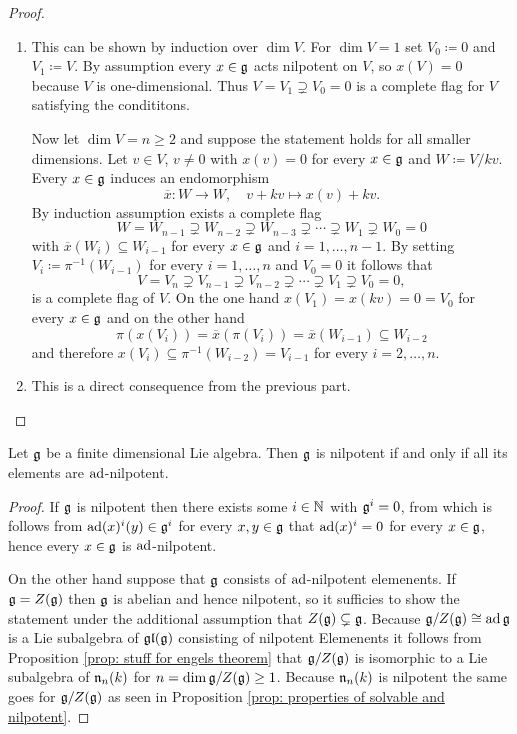 \begin{proof}
\begin{enumerate}[leftmargin=*]
  \item
   This can be shown by induction over $\dim V$. For $\dim V = 1$ set $V_0 \coloneqq 0$ and $V_1 \coloneqq V$. By assumption every $x \in \mathfrak{g}$ acts nilpotent on $V$, so $x(V) = 0$ because $V$ is one-dimensional. Thus $V = V_1 \supsetneq V_0 = 0$ is a complete flag for $V$ satisfying the condititons.
   
   Now let $\dim V = n \geq 2$ and suppose the statement holds for all smaller dimensions. Let $v \in V$, $v \neq 0$ with $x(v) = 0$ for every $x \in \mathfrak{g}$ and $W \coloneqq V / kv$. Every $x \in \mathfrak{g}$ induces an endomorphism
   \[
    \overline{x} \colon W \to W, \quad v + kv \mapsto x(v) + kv.
   \]
   By induction assumption exists a complete flag
   \[
    W = W_{n-1} \supsetneq W_{n-2} \supsetneq W_{n-3} \supsetneq \dotsb \supsetneq W_1 \supsetneq W_0 = 0
   \]
   with $\overline{x}(W_i) \subseteq W_{i-1}$ for every $x \in \mathfrak{g}$ and $i = 1, \dotsc, n-1$. By setting $V_i \coloneqq \pi^{-1}(W_{i-1})$ for every $i = 1, \dotsc, n$ and $V_0 = 0$ it follows that
   \[
    V = V_n \supsetneq V_{n-1} \supsetneq V_{n-2} \supsetneq \dotsb \supsetneq V_1 \supsetneq V_0 = 0,
   \]
   is a complete flag of $V$. On the one hand $x(V_1) = x(kv) = 0 = V_0$ for every $x \in \mathfrak{g}$ and on the other hand
   \[
    \pi(x(V_i))
    = \overline{x}(\pi(V_i))
    = \overline{x}(W_{i-1})
    \subseteq W_{i-2}
   \]
   and therefore $x(V_i) \subseteq \pi^{-1}(W_{i-2}) = V_{i-1}$ for every $i = 2, \dotsc, n$.
   
  \item
   This is a direct consequence from the previous part.
  \qedhere
 \end{enumerate}
\end{proof}



\begin{thrm}[Engel]
 Let $\mathfrak{g}$ be a finite dimensional Lie algebra. Then $\mathfrak{g}$ is nilpotent if and only if all its elements are $\operatorname{ad}$-nilpotent.
\end{thrm}
\begin{proof}
 If $\mathfrak{g}$ is nilpotent then there exists some $i \in \mathbb{N}$ with $\mathfrak{g}^i = 0$, from which is follows from $\operatorname{ad}(x)^i(y) \in \mathfrak{g}^i$ for every $x,y \in \mathfrak{g}$ that $\operatorname{ad}(x)^i = 0$ for every $x \in \mathfrak{g}$, hence every $x \in \mathfrak{g}$ is $\operatorname{ad}$-nilpotent.
 
 On the other hand suppose that $\mathfrak{g}$ consists of $\operatorname{ad}$-nilpotent elemenents. If $\mathfrak{g} = Z(\mathfrak{g})$ then $\mathfrak{g}$ is abelian and hence nilpotent, so it sufficies to show the statement under the additional assumption that $Z(\mathfrak{g}) \subsetneq \mathfrak{g}$. Because $\mathfrak{g}/Z(\mathfrak{g}) \cong \operatorname{ad} \mathfrak{g}$ is a Lie subalgebra of $\mathfrak{gl}(\mathfrak{g})$ consisting of nilpotent Elemenents it follows from Proposition \ref{prop: stuff for engels theorem} that $\mathfrak{g}/Z(\mathfrak{g})$ is isomorphic to a Lie subalgebra of $\mathfrak{n}_n(k)$ for $n = \dim \mathfrak{g}/Z(\mathfrak{g}) \geq 1$. Because $\mathfrak{n}_n(k)$ is nilpotent the same goes for $\mathfrak{g}/Z(\mathfrak{g})$ as seen in Proposition \ref{prop: properties of solvable and nilpotent}.
\end{proof}





